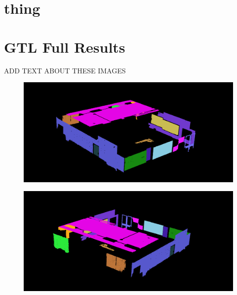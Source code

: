 \appendix
\chapter{thing}



\chapter{GTL Full Results}

ADD TEXT ABOUT THESE IMAGES

\begin{figure}[H]
\centering
\includegraphics[width=1\linewidth]{Includes/images/Appendix/GTL-Full-seg}
\caption{}
\label{fig:GTL-Full-seg}
\end{figure}

\begin{figure}[H]
	\centering
	\includegraphics[width=1\linewidth]{Includes/images/Appendix/GTL-Full-seg2}
	\caption{}
	\label{fig:GTL-Full-seg2}
\end{figure}


